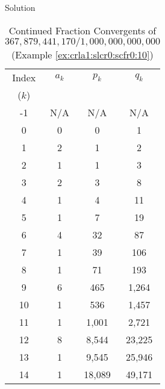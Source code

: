 \begin{vworkexampleparsection}{Solution}
\begin{table}
\caption{Continued Fraction Convergents of $367,879,441,170/1,000,000,000,000$ (Example \ref{ex:crla1:slcr0:scfr0:10})}
\label{tbl:crla1:slcr0:scfr0:10b}
\begin{center}
\begin{tabular}{|c|c|c|c|}
\hline
\small{Index} & \small{$a_k$} & \small{$p_k$}           & \small{$q_k$}            \\
\small{($k$)} &               &                         &                          \\
\hline
\hline
\small{-1}    & \small{N/A}   & \small{N/A}             & \small{N/A}              \\
\hline
\small{0}     & \small{0}     & \small{0}               & \small{1}                \\
\hline
\small{1}     & \small{2}     & \small{1}               & \small{2}                \\
\hline
\small{2}     & \small{1}     & \small{1}               & \small{3}                \\
\hline
\small{3}     & \small{2}     & \small{3}               & \small{8}                \\
\hline
\small{4}     & \small{1}     & \small{4}               & \small{11}               \\
\hline
\small{5}     & \small{1}     & \small{7}               & \small{19}               \\
\hline
\small{6}     & \small{4}     & \small{32}              & \small{87}               \\
\hline
\small{7}     & \small{1}     & \small{39}              & \small{106}              \\
\hline
\small{8}     & \small{1}     & \small{71}              & \small{193}              \\
\hline
\small{9}     & \small{6}     & \small{465}             & \small{1,264}            \\
\hline
\small{10}    & \small{1}     & \small{536}             & \small{1,457}            \\
\hline
\small{11}    & \small{1}     & \small{1,001}           & \small{2,721}            \\
\hline
\small{12}    & \small{8}     & \small{8,544}           & \small{23,225}           \\
\hline
\small{13}    & \small{1}     & \small{9,545}           & \small{25,946}           \\
\hline
\small{14}    & \small{1}     & \small{18,089}          & \small{49,171}          \\

\end{tabular}
\end{center}
\end{table}
\end{vworkexampleparsection}
